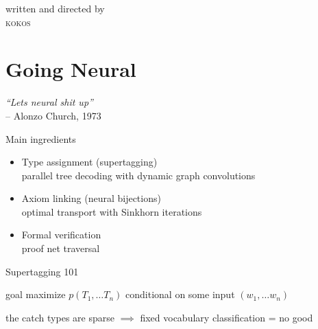 \documentclass{beamer}
\begin{document}
{%
\begin{frame}[plain]{}
\larger[2]
\vfill
\centering
\textcolor{teal!50}{
written and directed by\\
\textsc{kokos}
}
\vfill
\end{frame}
}

\section{Going Neural}

\begin{frame}
\flushright
\larger
\textit{``Lets neural shit up''}\\
\smaller[2]
-- Alonzo Church, 1973
\end{frame}


\begin{frame}{Main ingredients}
\smaller

\begin{itemize}
\item Type assignment (supertagging)\\
parallel tree decoding with dynamic graph convolutions
\item Axiom linking (neural bijections)\\
optimal transport with Sinkhorn iterations
\item Formal verification\\
proof net traversal
\end{itemize}
\end{frame}


\begin{frame}{Supertagging 101}
	\smaller
	
	\begin{block}{goal}
	maximize $p(T_1, \dots T_n)$ conditional on some input $(w_1,\dots w_n)$	
	\end{block}
	\vfill
	\pause
	\begin{block}{\alert{the catch}}
	types are sparse $\implies$ fixed vocabulary classification = no good
	\end{block}
\end{frame}
\end{document}
